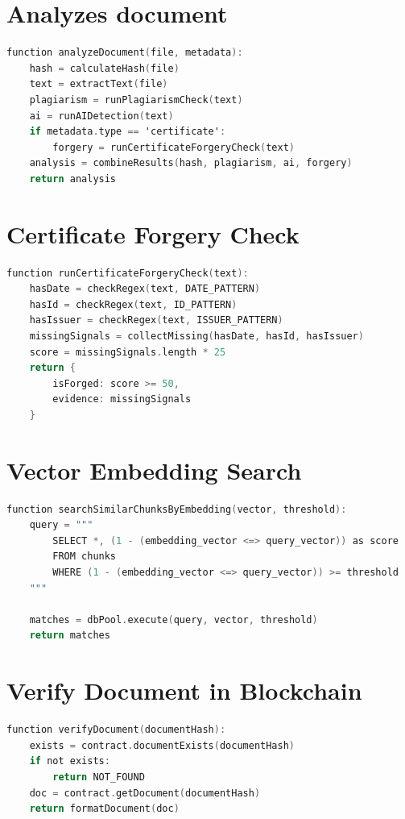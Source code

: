 \section{Analyzes document}
\label{appendix:code-analyze_doc}

\begin{lstlisting}[language={C}]
function analyzeDocument(file, metadata):
    hash = calculateHash(file)
    text = extractText(file)
    plagiarism = runPlagiarismCheck(text)
    ai = runAIDetection(text)
    if metadata.type == 'certificate':
        forgery = runCertificateForgeryCheck(text)   
    analysis = combineResults(hash, plagiarism, ai, forgery)
    return analysis
\end{lstlisting}

\section{Certificate Forgery Check}
\label{appendix:code-cert_forgery_check}
\begin{lstlisting}[language={C}]
function runCertificateForgeryCheck(text):
    hasDate = checkRegex(text, DATE_PATTERN)
    hasId = checkRegex(text, ID_PATTERN)
    hasIssuer = checkRegex(text, ISSUER_PATTERN)
    missingSignals = collectMissing(hasDate, hasId, hasIssuer)
    score = missingSignals.length * 25
    return {
        isForged: score >= 50,
        evidence: missingSignals
    }
\end{lstlisting}


\section{Vector Embedding Search}
\label{appendix:code-vector_embedding_search}
\begin{lstlisting}[language={C}]
function searchSimilarChunksByEmbedding(vector, threshold):
    query = """
        SELECT *, (1 - (embedding_vector <=> query_vector)) as score 
        FROM chunks 
        WHERE (1 - (embedding_vector <=> query_vector)) >= threshold
    """
    
    matches = dbPool.execute(query, vector, threshold)
    return matches
\end{lstlisting}

\section{Verify Document in Blockchain}
\label{appendix:code-verify_document_in_blockchian}
\begin{lstlisting}[language={C}]
function verifyDocument(documentHash):
    exists = contract.documentExists(documentHash)
    if not exists:
        return NOT_FOUND
    doc = contract.getDocument(documentHash)
    return formatDocument(doc)
\end{lstlisting}